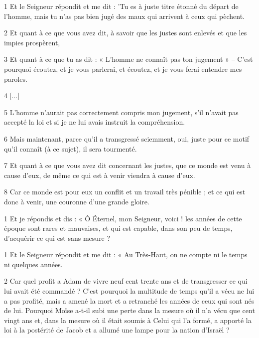 
\par 1 Et le Seigneur répondit et me dit : 'Tu es à juste titre étonné du départ de l'homme, mais tu n'as pas bien jugé des maux qui arrivent à ceux qui pèchent.

\par 2 Et quant à ce que vous avez dit, à savoir que les justes sont enlevés et que les impies prospèrent,

\par 3 Et quant à ce que tu as dit : « L’homme ne connaît pas ton jugement » – C’est pourquoi écoutez, et je vous parlerai, et écoutez, et je vous ferai entendre mes paroles.

\par 4 [...]

\par 5 L'homme n'aurait pas correctement compris mon jugement, s'il n'avait pas accepté la loi et si je ne lui avais instruit la compréhension.

\par 6 Mais maintenant, parce qu'il a transgressé sciemment, oui, juste pour ce motif qu'il connaît (à ce sujet), il sera tourmenté.

\par 7 Et quant à ce que vous avez dit concernant les justes, que ce monde est venu à cause d'eux, de même ce qui est à venir viendra à cause d'eux.

\par 8 Car ce monde est pour eux un conflit et un travail très pénible ; et ce qui est donc à venir, une couronne d'une grande gloire.


\par 1 Et je répondis et dis : « Ô Éternel, mon Seigneur, voici ! les années de cette époque sont rares et mauvaises, et qui est capable, dans son peu de temps, d'acquérir ce qui est sans mesure ?


\par 1 Et le Seigneur répondit et me dit : « Au Très-Haut, on ne compte ni le temps ni quelques années.

\par 2 Car quel profit a Adam de vivre neuf cent trente ans et de transgresser ce qui lui avait été commandé ? C'est pourquoi la multitude de temps qu'il a vécu ne lui a pas profité, mais a amené la mort et a retranché les années de ceux qui sont nés de lui. Pourquoi Moïse a-t-il subi une perte dans la mesure où il n'a vécu que cent vingt ans et, dans la mesure où il était soumis à Celui qui l'a formé, a apporté la loi à la postérité de Jacob et a allumé une lampe pour la nation d'Israël ?

